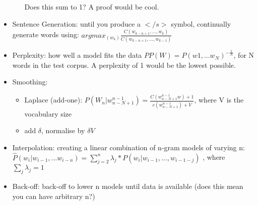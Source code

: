 \documentclass[a4paper]{article}
\begin{document}
\begin{itemize}
\begin{itemize}
				Does this sum to 1? A proof would be cool.
				
			\end{itemize}
		
		\item Sentence Generation: until you produce a $</s>$ symbol, continually generate words using: $argmax_(w_k) \frac{C(w_{k-n+1},...,w_k)}{C(w_{k-n+1},...,w_{k-1})}$ 
		
		\item Perplexity: how well a model fits the data $PP(W) = P(w1,...w_N)^{-\frac{1}{N}}$, for N words in the test corpus. A perplexity of 1 would be the lowest possible.
		
		\item Smoothing: 
		
			\begin{itemize}
				\item Laplace (add-one): $P(W_n | w_{n - N + 1}^{n-1}) = \frac{C( w_{n - N + 1}^{n-1}w) + 1}{c( w_{n - N + 1}^{n-1}) + V}$, where V is the vocabulary size
				
				\item add $\delta$, normalise by $\delta V$
			
			\end{itemize}
		
	\item Interpolation: creating a linear combination of n-gram models of varying n: $\hat{P}(w_i | w_{i-1},...w_{i-n}) = \sum_{j=2}^{n} \lambda_j * P(w_i | w_{i-1},...,w_{i-1-j})$ , where $\sum_{j}\lambda_j = 1$ 
	
	\item Back-off: back-off to lower n models until data is available (does this mean you can have arbitrary n?)
	
	
		
	\end{itemize}
	
	\textbf{}
	
	
	
\end{document}
